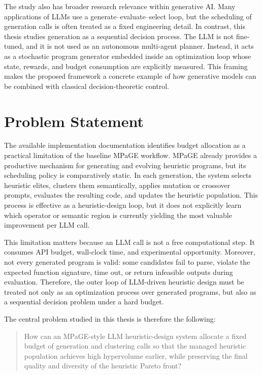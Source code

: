 \documentclass[../main.tex]{subfiles}
\begin{document}
The study also has broader research relevance within generative AI. Many applications of LLMs use a generate--evaluate--select loop, but the scheduling of generation calls is often treated as a fixed engineering detail. In contrast, this thesis studies generation as a sequential decision process. The LLM is not fine-tuned, and it is not used as an autonomous multi-agent planner. Instead, it acts as a stochastic program generator embedded inside an optimization loop whose state, rewards, and budget consumption are explicitly measured. This framing makes the proposed framework a concrete example of how generative models can be combined with classical decision-theoretic control.

\section{Problem Statement}

The available implementation documentation identifies budget allocation as a practical limitation of the baseline MPaGE workflow. MPaGE already provides a productive mechanism for generating and evolving heuristic programs, but its scheduling policy is comparatively static. In each generation, the system selects heuristic elites, clusters them semantically, applies mutation or crossover prompts, evaluates the resulting code, and updates the heuristic population. This process is effective as a heuristic-design loop, but it does not explicitly learn which operator or semantic region is currently yielding the most valuable improvement per LLM call.

This limitation matters because an LLM call is not a free computational step. It consumes API budget, wall-clock time, and experimental opportunity. Moreover, not every generated program is valid: some candidates fail to parse, violate the expected function signature, time out, or return infeasible outputs during evaluation. Therefore, the outer loop of LLM-driven heuristic design must be treated not only as an optimization process over generated programs, but also as a sequential decision problem under a hard budget.

The central problem studied in this thesis is therefore the following:

\begin{quote}
How can an MPaGE-style LLM heuristic-design system allocate a fixed budget of generation and clustering calls so that the managed heuristic population achieves high hypervolume earlier, while preserving the final quality and diversity of the heuristic Pareto front?
\end{quote}
\end{document}
